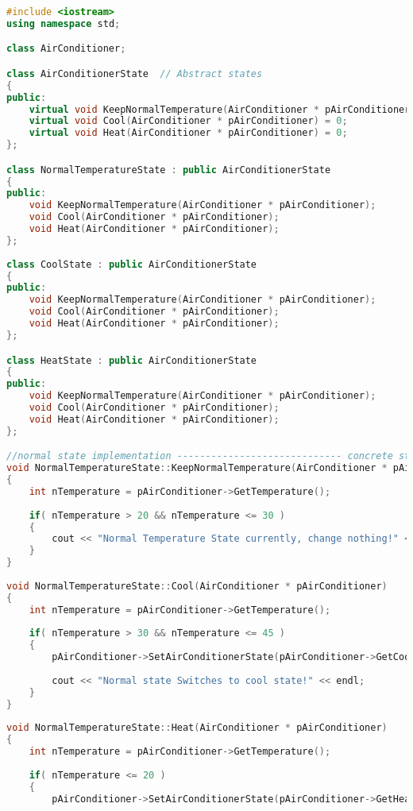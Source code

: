 \documentclass{book}
\begin{document}
\begin{lstlisting}[caption={State Pattern exmaple 1}, language=C++]
#include <iostream>  
using namespace std;  

class AirConditioner;

class AirConditionerState  // Abstract states
{  
public:   
    virtual void KeepNormalTemperature(AirConditioner * pAirConditioner) = 0;  
    virtual void Cool(AirConditioner * pAirConditioner) = 0;  
    virtual void Heat(AirConditioner * pAirConditioner) = 0;  
};  

class NormalTemperatureState : public AirConditionerState  
{  
public:   
    void KeepNormalTemperature(AirConditioner * pAirConditioner);  
    void Cool(AirConditioner * pAirConditioner);  
    void Heat(AirConditioner * pAirConditioner);  
};  
  
class CoolState : public AirConditionerState  
{  
public:   
    void KeepNormalTemperature(AirConditioner * pAirConditioner);  
    void Cool(AirConditioner * pAirConditioner);  
    void Heat(AirConditioner * pAirConditioner);  
};  

class HeatState : public AirConditionerState  
{  
public:   
    void KeepNormalTemperature(AirConditioner * pAirConditioner);  
    void Cool(AirConditioner * pAirConditioner);  
    void Heat(AirConditioner * pAirConditioner);  
};  

//normal state implementation ----------------------------- concrete states
void NormalTemperatureState::KeepNormalTemperature(AirConditioner * pAirConditioner)  
{  
    int nTemperature = pAirConditioner->GetTemperature();  
  
    if( nTemperature > 20 && nTemperature <= 30 )  
    {  
        cout << "Normal Temperature State currently, change nothing!" << endl;  
    }  
}  
  
void NormalTemperatureState::Cool(AirConditioner * pAirConditioner)  
{  
    int nTemperature = pAirConditioner->GetTemperature();  
      
    if( nTemperature > 30 && nTemperature <= 45 )  
    {  
        pAirConditioner->SetAirConditionerState(pAirConditioner->GetCoolState());  
  
        cout << "Normal state Switches to cool state!" << endl;  
    }  
}  
      
void NormalTemperatureState::Heat(AirConditioner * pAirConditioner)  
{  
    int nTemperature = pAirConditioner->GetTemperature();  
      
    if( nTemperature <= 20 )  
    {  
        pAirConditioner->SetAirConditionerState(pAirConditioner->GetHeatState());  
  

\end{lstlisting}
\end{document}

